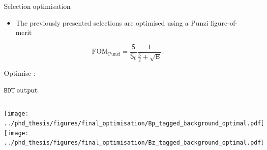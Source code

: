\documentclass[xcolor=dvipsnames]{beamer}
\begin{document}
\begin{frame}{Selection optimisation}
\centering\scriptsize

\begin{itemize}
   \item The previously presented selections are optimised using a Punzi figure-of-merit
\end{itemize}

\begin{equation}\nonumber
   \mathrm{FOM}_{\mathrm{Punzi}}= \frac{\mathsf{S}}{\mathsf{S}_0} \frac{1}{\frac{3}{2}+\sqrt{\mathsf{B}}}.
\end{equation}

Optimise :

      \ZMVA \hspace{1cm}      
      \piVeto  \hspace{1cm}   
      \etaVeto  \hspace{1cm}
      $\mathtt{BDT~output}$


\vspace{5pt}

\begin{columns}
   \centering
   \texttt{[image: ../phd\_thesis/figures/final\_optimisation/Bp\_tagged\_background\_optimal.pdf]}
   \centering
   \texttt{[image: ../phd\_thesis/figures/final\_optimisation/Bz\_tagged\_background\_optimal.pdf]}
\end{columns}


\end{frame}
\end{document}
